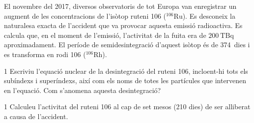 El novembre del 2017, diversos observatoris de tot Europa van enregistrar un augment de les concentracions de l'isòtop ruteni 106 (${}^{106}\mathrm{Ru}$). Es desconeix la naturalesa exacta de l'accident que va provocar aquesta emissió radioactiva. Es calcula que, en el moment de l'emissió, l'activitat de la fuita era de $200\ \mathrm{TBq}$ aproximadament. El període de semidesintegració d'aquest isòtop és de 374~dies i es transforma en rodi 106 (${}^{106}\mathrm{Rh}$).

\begin{apartat}{1}
Escriviu l'equació nuclear de la desintegració del ruteni 106, incloent-hi tots els subíndexs i superíndexs, així com els noms de totes les partícules que intervenen en l'equació. Com s'anomena aquesta desintegració?
\end{apartat}

\begin{apartat}{1}
Calculeu l'activitat del ruteni 106 al cap de set mesos (210 dies) de ser alliberat a causa de l'accident.
\end{apartat}

